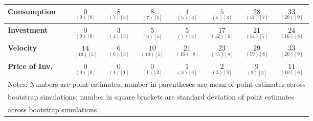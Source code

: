 \documentclass{article}
\begin{document}
\begin{tabular}{|l|c|@{}c|c|@{}c|c|@{}c|c|}
 \textbf{Consumption} & $\underset{(  0) [  0]}{  0}$ & $\underset{(  7) [  4]}{  8}$ & $\underset{(  7) [  5]}{  8}$ & $\underset{(  5) [  3]}{  4}$ & $\underset{(  5) [  3]}{  5}$ & $\underset{( 17) [  7]}{ 28}$ & $\underset{( 20) [  9]}{ 33}$ \\ \hline 
 \textbf{Investment} & $\underset{(  0) [  0]}{  0}$ & $\underset{(  4) [  3]}{  3}$ & $\underset{(  6) [  5]}{  5}$ & $\underset{(  7) [  4]}{  5}$ & $\underset{( 12) [  6]}{ 17}$ & $\underset{( 14) [  7]}{ 21}$ & $\underset{( 16) [  8]}{ 24}$ \\ \hline 
 \textbf{Velocity} & $\underset{( 13) [  5]}{ 14}$ & $\underset{(  6) [  3]}{  6}$ & $\underset{( 10) [  5]}{ 10}$ & $\underset{( 16) [  8]}{ 21}$ & $\underset{( 15) [  8]}{ 23}$ & $\underset{( 19) [  8]}{ 29}$ & $\underset{( 20) [  9]}{ 33}$ \\ \hline 
 \textbf{Price of Inv.} & $\underset{(  0) [  0]}{  0}$ & $\underset{(  1) [  1]}{  0}$ & $\underset{(  1) [  2]}{  0}$ & $\underset{(  3) [  3]}{  1}$ & $\underset{(  3) [  3]}{  2}$ & $\underset{(  9) [  5]}{  9}$ & $\underset{( 10) [  6]}{ 11}$ \\ \hline 
 \multicolumn{8}{|l|}{Notes: Numbers are point estimates, number in 
 parentheses are mean of point estimates across} \\ \hline 
 \multicolumn{8}{|l|}{bootstrap simulations; number in square brackets are 
 standard deviation of point estimates} \\ \hline 
 \multicolumn{8}{|l|}{across bootstrap simulations.} \\ \hline 
 \end{tabular} 
\end{document}
